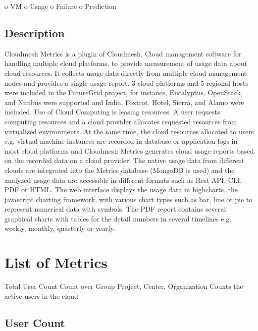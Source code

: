 \documentclass{sig-alternate-05-2015}
\begin{document}
o  VM
o  Usage
o  Failure
o  Prediction

\subsection{Description}

Cloudmesh Metrics is a plugin of Cloudmesh, Cloud management software for handling multiple cloud platforms, to provide measurement of usage data about cloud resources. It collects usage data directly from multiple cloud management nodes and provides a single usage report. 3 cloud platforms and 5 regional hosts were included in the FutureGrid project, for instance, Eucalyptus, OpenStack, and Nimbus were supported and India, Foxtrot, Hotel, Sierra, and Alamo were included. Use of Cloud Computing is leasing resources. A user requests computing resources and a cloud provider allocates requested resources from virtualized environments. At the same time, the cloud resources allocated to users e.g. virtual machine instances are recorded in database or application logs in most cloud platforms and Cloudmesh Metrics generates cloud usage reports based on the recorded data on a cloud provider. The native usage data from different clouds are integrated into the Metrics database (MongoDB is used) and the analyzed usage data are accessible in different formats such as Rest API, CLI, PDF or HTML. The web interface displays the usage data in highcharts, the javascript charting framework, with various chart types such as bar, line or pie to represent numerical data with symbols. The PDF report contains several graphical charts with tables for the detail numbers in several timelines e.g. weekly, monthly, quarterly or yearly. 

\section{List of Metrics}



Total User Count
Count over Group
Project, Center, Organization
Counts the active users in the cloud

\subsection{User Count}
\end{document}
